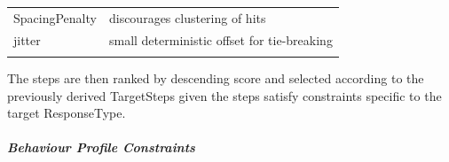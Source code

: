 {\begin{longtable}[]{@{}
  >{\raggedright\arraybackslash}p{}
  >{\raggedright\arraybackslash}p{}@{}}
\begin{minipage}[b]{\linewidth}
SpacingPenalty
\end{minipage} & \begin{minipage}[b]{\linewidth}\raggedright
discourages clustering of hits
\end{minipage} \\
\begin{minipage}[b]{\linewidth}\raggedright
jitter
\end{minipage} & \begin{minipage}[b]{\linewidth}\raggedright
small deterministic offset for tie-breaking
\end{minipage} \\
\midrule\noalign{}
\endhead
\bottomrule\noalign{}
\endlastfoot
\end{longtable}
}

The steps are then ranked by descending score and selected according to
the previously derived TargetSteps given the steps satisfy constraints
specific to the target ResponseType.

\subparagraph{Behaviour Profile
Constraints}\label{behaviour-profile-constraints}


